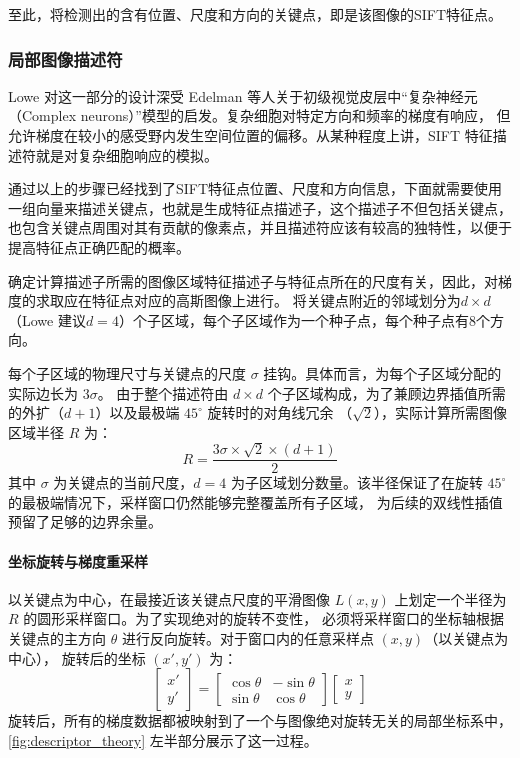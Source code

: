 \documentclass[12pt,hyperref,a4paper,UTF8]{ctexart}
\begin{document}
至此，将检测出的含有位置、尺度和方向的关键点，即是该图像的SIFT特征点。

\subsubsection{局部图像描述符}

Lowe 对这一部分的设计深受 Edelman 等人关于初级视觉皮层中“复杂神经元（Complex neurons）”模型的启发。复杂细胞对特定方向和频率的梯度有响应，
但允许梯度在较小的感受野内发生空间位置的偏移。从某种程度上讲，SIFT 特征描述符就是对复杂细胞响应的模拟。

通过以上的步骤已经找到了SIFT特征点位置、尺度和方向信息，下面就需要使用一组向量来描述关键点，也就是生成特征点描述子，这个描述子不但包括关键点，
也包含关键点周围对其有贡献的像素点，并且描述符应该有较高的独特性，以便于提高特征点正确匹配的概率。

确定计算描述子所需的图像区域特征描述子与特征点所在的尺度有关，因此，对梯度的求取应在特征点对应的高斯图像上进行。
将关键点附近的邻域划分为$d×d$（Lowe 建议$d=4$）个子区域，每个子区域作为一个种子点，每个种子点有8个方向。

每个子区域的物理尺寸与关键点的尺度 $\sigma$ 挂钩。具体而言，为每个子区域分配的实际边长为 $3\sigma$。
由于整个描述符由 $d \times d$ 个子区域构成，为了兼顾边界插值所需的外扩（$d+1$）以及最极端 $45^\circ$ 旋转时的对角线冗余
（$\sqrt{2}$），实际计算所需图像区域半径 $R$ 为：
\begin{equation}
    R = \frac{3\sigma \times \sqrt{2} \times (d+1)}{2}
\end{equation}
其中 $\sigma$ 为关键点的当前尺度，$d=4$ 为子区域划分数量。该半径保证了在旋转 $45^\circ$ 的最极端情况下，采样窗口仍然能够完整覆盖所有子区域，
为后续的双线性插值预留了足够的边界余量。

\paragraph{坐标旋转与梯度重采样}

以关键点为中心，在最接近该关键点尺度的平滑图像 $L(x,y)$ 上划定一个半径为 $R$ 的圆形采样窗口。为了实现绝对的旋转不变性，
必须将采样窗口的坐标轴根据关键点的主方向 $\theta$ 进行反向旋转。对于窗口内的任意采样点 $(x,y)$（以关键点为中心），
旋转后的坐标 $(x', y')$ 为：
\begin{equation}
    \begin{bmatrix} x' \\ y' \end{bmatrix} =
    \begin{bmatrix} \cos\theta & -\sin\theta \\ \sin\theta & \cos\theta \end{bmatrix}
    \begin{bmatrix} x \\ y \end{bmatrix}
\end{equation}
旋转后，所有的梯度数据都被映射到了一个与图像绝对旋转无关的局部坐标系中，\autoref{fig:descriptor_theory} 左半部分展示了这一过程。
\end{document}
